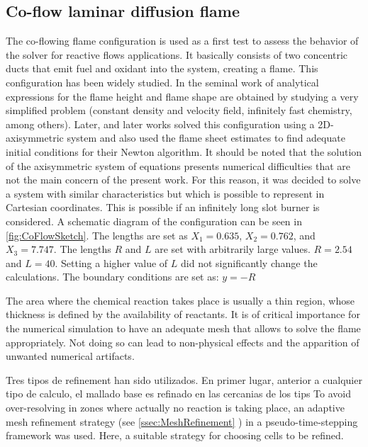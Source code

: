 
\subsection{Co-flow laminar diffusion flame}\label{ssec:coflowFlame}
The co-flowing flame configuration is used as a first test to assess the behavior of the solver for reactive flows applications. It basically consists of two concentric ducts that emit fuel and oxidant into the system, creating a flame. This configuration has been widely studied. In the seminal work of \cite{burkeDiffusionFlames1928} analytical expressions for the flame height and flame shape are obtained by studying a very simplified problem (constant density and velocity field, infinitely fast chemistry, among others). Later, \cite{smookeNumericalModelingAxisymmetric1992} and later works solved this configuration using a 2D-axisymmetric system and also used the flame sheet estimates to find adequate initial conditions for their Newton algorithm. It should be noted that the solution of the axisymmetric system of equations presents numerical difficulties that are not the main concern of the present work. For this reason, it was decided to solve a system with similar characteristics but which is possible to represent in Cartesian coordinates. This is possible if an infinitely long slot burner is considered. A schematic diagram of the configuration can be seen in \cref{fig:CoFlowSketch}. The lengths are set as $X_1 = 0.635$, $X_2 = 0.762$, and $X_3 = 7.747$. The lengths $R$ and $L$ are set with arbitrarily large values.  $R = 2.54$ and $L = 40$. Setting a higher value of $L$ did not significantly change the calculations.  %
The boundary conditions are set as: 
$y = -R$



The area where the chemical reaction takes place is usually a thin region, whose thickness is defined by the availability of reactants. It is of critical importance for the numerical simulation to have an adequate mesh that allows to solve the flame appropriately. Not doing so can lead to non-physical effects and the apparition of unwanted numerical artifacts.  

Tres tipos de refinement han sido utilizados. En primer lugar, anterior a cualquier tipo de calculo, el mallado base es refinado en las cercanias de los tips 
To avoid over-resolving in zones where actually no reaction is taking place, an adaptive mesh refinement strategy (see \cref{ssec:MeshRefinement} ) in a pseudo-time-stepping framework was used.  Here, a suitable strategy for choosing cells to be refined. 

